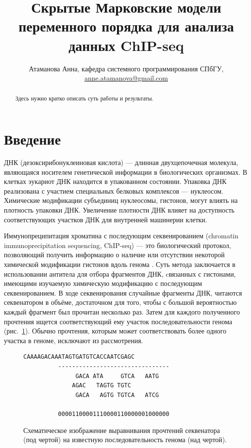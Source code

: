\documentclass[10pt,a4paper]{article}
\begin{document}
\title{Скрытые Марковские модели переменного порядка для анализа данных
  ChIP-seq}
\author{Атаманова Анна, кафедра системного программирования СПбГУ, \url{anne.atamanova@gmail.com}}

\maketitle

\begin{abstract}
  Здесь нужно кратко описать суть работы и результаты.
\end{abstract}

\section{Введение}

ДНК (дезоксирибонуклеиновая кислота) --- длинная двухцепочечная молекула, являющаяся носителем
генетической информации в биологических организмах. В клетках эукариот ДНК
находится в упакованном состоянии. Упаковка ДНК реализована с участием
специальных белковых комплексов --- нуклеосом. Химические модификации субъединиц
нуклеосомы, гистонов, могут влиять на плотность упаковки ДНК. Увеличение
плотности ДНК влияет на доступность соответствующих участков ДНК для внутренней
машинерии клетки.


Иммунопреципитация хроматина с последующим секвенированием (chromatin
immunoprecipitation sequencing, ChIP-seq) --- это биологический протокол,
позволяющий получить информацию о наличие или отсутствии некоторой химической
модификации гистонов вдоль генома \cite{Johnson2007}. Суть метода заключается в
использовании антитела для отбора фрагментов ДНК, cвязанных с гистонами,
имеющими изучаемую химическую модификацию с последующим секвенированием. В ходе
секвенирования случайные фрагменты ДНК, читаются секвенатором в объёме,
достаточном для того, чтобы с большой вероятностью каждый фрагмент был прочитан
несколько раз. Затем для каждого полученного прочтения ищется соответствующий
ему участок последовательности генома (рис.~\ref{fig:chip-seq}). Обычно
прочтения, которым может соответствовать более одного участка в геноме,
исключают из рассмотрения.

\begin{figure}[h]
  \centering
\begin{Verbatim}[commandchars=\\\{\}]
          CAAAAGACAAATAGTGATGTCACCAATCGAGC
          --------------------------------
               GACA ATA     GTCA   AATG
              AGAC   TAGTG TGTC
               GACA   AGTG TGTCA   ATCG

          00001100001110000110000001000000
\end{Verbatim}
  \caption{Схематическое изображение выравнивания прочтений секвенатора (под чертой)
    на известную последовательность генома (над чертой).}
  \label{fig:chip-seq}
\end{figure}
\end{document}
